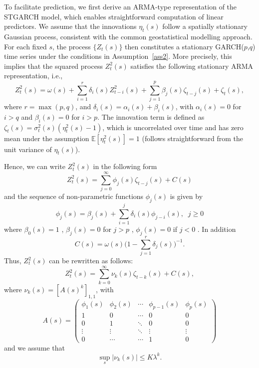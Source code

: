 \documentclass[fleqn,11pt]{article}
\begin{document}
To facilitate prediction, we first derive an ARMA-type representation of the STGARCH model, which enables straightforward computation of linear predictors. We assume that the innovations $\eta_t(s)$ follow a spatially stationary Gaussian process, consistent with the common geostatistical modelling approach. For each fixed $s$, the process $\{Z_t(s)\}$ then constitutes a stationary GARCH($p$,$q$) time series under the conditions in Assumption~\ref{ass2}. More precisely, this implies that the squared process $Z_t^2(s)$ satisfies the following stationary ARMA representation, i.e.,
\begin{equation}\label{eq:arma}
    Z_t^2(s) = \omega(s) + \sum_{i=1}^{r} \delta_i(s) Z_{t-i}^2(s) + \sum_{j=1}^{p} \beta_j(s) \zeta_{t-j}(s) + \zeta_t(s),
\end{equation}
where $r = \max(p,q)$, and $\delta_i(s) = \alpha_i(s) + \beta_i(s)$, with $\alpha_i(s) = 0$ for $i > q$ and $\beta_i(s) = 0$ for $i > p$. The innovation term is defined as $\zeta_t(s) = \sigma_t^2(s)(\eta_t^2(s) - 1)$, which is uncorrelated over time and has zero mean under the assumption $\mathbb{E}[\eta_t^2(s)] = 1$ (follows straightforward from the unit variance of $\eta_t(s)$).


Hence, we can write $Z_t^2(s)$ in the following form 
\begin{equation}
    Z_t^2(s) =  \sum_{j=0}^{\infty} \phi_j(s) \zeta_{t-j}(s) +  C(s)   
\end{equation}
and the sequence of non-parametric functions  $\phi_j(s)$ is given by 
\begin{equation}
    \phi_j(s) =  \beta_j(s) + \sum_{i=1}^j \delta_i(s) \phi_{j-i}(s),\;\;  j \geq 0 
\end{equation}
where $ \beta_0(s)=  1 $ , $ \beta_j(s) =0 $ for $ j >p $ , $\phi_j(s) = 0 $ if $ j < 0 $ . In addition 
\begin{equation}
    C(s) = \omega(s) \Big( 1- \sum_{j=1}^r \delta_j(s) \Big)^{-1}.
\end{equation}
Thus, $Z_t^2(s)$ can be rewritten as follows:
\begin{equation} \label{eq2}
Z_t^2(s) = \sum_{k=0}^{\infty} \nu_k(s) \zeta_{t-k}(s)+ C(s), 
\end{equation}
where $\nu_k(s) =  [A(s)^k]_{1,1}$, with
\begin{equation}
    A(s) = \begin{pmatrix}
\phi_1(s) &\phi_2(s) & \cdots & \phi_{p-1}(s)& \phi_p(s)\\
1 & 0 & \cdots & 0 & 0 \\
0& 1&\ddots & 0& 0 \\
\vdots& \vdots&  \ddots&\vdots& \vdots \\
0 &\cdots& \cdots & 1& 0\end{pmatrix}
\end{equation}
and we assume that 
\begin{equation}
    \sup_{s} |\nu_k(s)| \leq K \lambda^k.
\end{equation}
\end{document}

